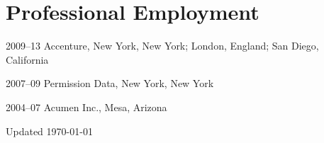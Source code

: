 \documentclass[11pt,letterpaper]{report} %
\begin{document}
    \section*{Professional Employment}

    \begin{tablist}

        \item[2009--13] \tab{}Accenture, New York, New York; London, England; San Diego, California
        \item[2007--09] \tab{}Permission Data, New York, New York
        \item[2004--07] \tab{}Acumen Inc., Mesa, Arizona

    \end{tablist}



    \begin{center}
        \vfill
        Updated \monthyeardate\today
    \end{center}
\end{document}
